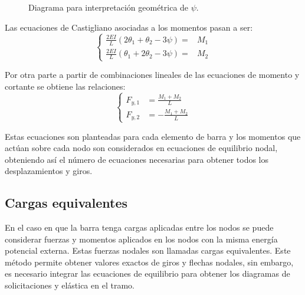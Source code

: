 \begin{figure}[htb]
	\centering
	\def\svgwidth{0.65\textwidth}
	
	\caption{Diagrama para interpretación geométrica de $\psi$.}
	\label{fig:psi}
\end{figure}


Las ecuaciones de Castigliano asociadas a los momentos pasan a ser: %
%
\begin{equation}\label{eqn:eqvig}
\left\{
\begin{array}{rl}
\displaystyle
\frac{2 EI}{L} \left( 2 \theta_1  + \theta_2 - 3 \psi   \right) =& M_1 \\[3mm]
\displaystyle
\frac{2 EI}{L} \left( \theta_1 + 2  \theta_2 - 3 \psi  \right) =& M_2
\end{array}
\right.
\end{equation}

Por otra parte a partir de combinaciones lineales de las ecuaciones de momento y cortante se obtiene las relaciones:
%
\begin{equation}
\left\{
\begin{array}{rl}
\displaystyle
F_{y,1} & \displaystyle
 = \frac{M_1 + M_2}{L} \\[5mm]
\displaystyle
F_{y,2} & \displaystyle
 = -\frac{M_1 + M_2}{L} 
\end{array}
\right.
\end{equation}

Estas ecuaciones son planteadas para cada elemento de barra y los momentos que actúan sobre cada nodo son considerados en ecuaciones de equilibrio nodal, obteniendo así el número de ecuaciones necesarias para obtener todos los desplazamientos y giros.




\subsection{Cargas equivalentes} \label{sec:cargequiv}

En el caso en que la barra tenga cargas aplicadas entre los nodos se puede considerar fuerzas y momentos aplicados en los nodos con la misma energía potencial externa. %
%
Estas fuerzas nodales son llamadas cargas equivalentes. %
%
Este método permite obtener valores exactos de giros y flechas nodales, sin embargo, es necesario integrar las ecuaciones de equilibrio para obtener los diagramas de solicitaciones  y elástica en el tramo.

%
%

